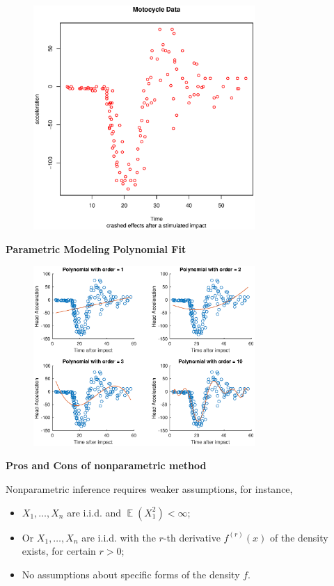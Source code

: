 \documentclass[19pt,landscaoe]{article}
\DeclareMathOperator{\E}{\mathbb{E}}
\begin{document}
\begin{figure}[h]
\centering
      \includegraphics[width=0.75\textwidth,height=0.52\textwidth]{MotocycleData.eps}
    \label{figure2} 

\end{figure}

\newpage
{\LARGE{\textbf{Parametric Modeling}}}
\vskip25pt
{\Large\bf{Polynomial Fit}}

\begin{figure}[h]
\centering
      \includegraphics[width=0.75\textwidth,height=0.52\textwidth]{polyfitting.eps}
    \label{figure2} 

\end{figure}

\newpage
{\LARGE\centerline{\textbf{Pros and Cons of nonparametric method}}}
\vskip25pt
\begin{minipage}{.9\textwidth}
    \Large

Nonparametric inference requires weaker assumptions, for instance, 
\vfill
\begin{itemize}
\item $X_1,\dots,X_n$ are i.i.d. and $\E(X_1^2)<\infty$;
\item Or $X_1,\dots,X_n$ are i.i.d. with the $r$-th derivative $f^{(r)}(x)$ of the density exists, for certain $r>0$;
\item No assumptions about specific forms of the density $f$.
\end{itemize}
\end{minipage}
\end{document}
